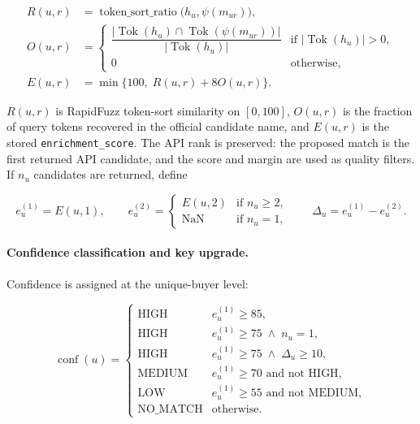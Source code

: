 \documentclass[12pt, a4paper]{article}
\begin{document}
\begin{align}
  R(u,r) &= \operatorname{token\_sort\_ratio}\bigl(h_u,\psi(m_{ur})\bigr), \\
  O(u,r) &=
    \begin{cases}
      \dfrac{|\operatorname{Tok}(h_u)\cap \operatorname{Tok}(\psi(m_{ur}))|}
            {|\operatorname{Tok}(h_u)|}
      & \text{if } |\operatorname{Tok}(h_u)|>0,\\[6pt]
      0 & \text{otherwise},
    \end{cases} \\
  E(u,r) &= \min\{100,\;R(u,r)+8O(u,r)\}.
\end{align}

\noindent $R(u,r)$ is RapidFuzz token-sort similarity on $[0,100]$, $O(u,r)$ is
the fraction of query tokens recovered in the official candidate name, and
$E(u,r)$ is the stored \texttt{enrichment\_score}. The API rank is preserved:
the proposed match is the first returned API candidate, and the score and
margin are used as quality filters. If $n_u$ candidates are returned, define

\begin{equation}
  e_u^{(1)} = E(u,1), \qquad
  e_u^{(2)} =
  \begin{cases}
    E(u,2) & \text{if } n_u \geq 2,\\
    \text{NaN} & \text{if } n_u = 1,
  \end{cases}
  \qquad
  \Delta_u = e_u^{(1)} - e_u^{(2)}.
\end{equation}

\paragraph{Confidence classification and key upgrade.}
Confidence is assigned at the unique-buyer level:

\begin{equation}
  \operatorname{conf}(u)=
  \begin{cases}
    \text{HIGH} & e_u^{(1)} \geq 85,\\
    \text{HIGH} & e_u^{(1)} \geq 75 \;\land\; n_u=1,\\
    \text{HIGH} & e_u^{(1)} \geq 75 \;\land\; \Delta_u \geq 10,\\
    \text{MEDIUM} & e_u^{(1)} \geq 70 \text{ and not HIGH},\\
    \text{LOW} & e_u^{(1)} \geq 55 \text{ and not MEDIUM},\\
    \text{NO\_MATCH} & \text{otherwise.}
  \end{cases}
\end{equation}
\end{document}
